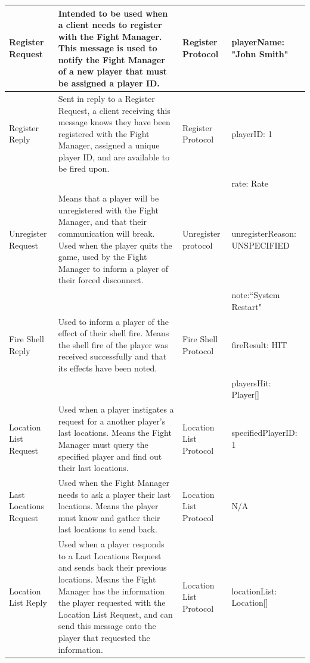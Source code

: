 \documentclass[12pt]{article}
\begin{document}
			\begin{supertabular}{|p{2cm}|p{5cm}|p{3cm}|p{4cm}|}
				Register Request & Intended to be used when a client needs to register with the Fight Manager. This message is used to notify the Fight Manager of a new player that must be assigned a player ID. & Register Protocol & playerName: "John Smith" \\ \hline
				Register Reply & Sent in reply to a Register Request, a client receiving this message knows they have been registered with the Fight Manager, assigned a unique player ID, and are available to be fired upon. & Register Protocol & playerID: 1 \\&&& rate: Rate \\ \hline
				
				Unregister Request & Means that a player will be unregistered with the Fight Manager, and that their communication will break. Used when the player quits the game, used by the Fight Manager to inform a player of their forced disconnect. & Unregister protocol & unregisterReason: UNSPECIFIED \\ &&&note:``System Restart" \\ \hline
				
				Fire Shell Reply & Used to inform a player of the effect of their shell fire. Means the shell fire of the player was received successfully and that its effects have been noted. & Fire Shell Protocol & fireResult: HIT \\&&&playersHit: Player[]\\ \hline
				
				Location List Request& Used when a player instigates a request for a another player's last locations. Means the Fight Manager must query the specified player and find out their last locations.& Location List Protocol&specifiedPlayerID: 1\\ \hline
				Last Locations Request&Used when the Fight Manager needs to ask a player their last locations. Means the player must know and gather their last locations to send back.&Location List Protocol&N/A\\ \hline
				Location List Reply&Used when a player responds to a Last Locations Request and sends back their previous locations. Means the Fight Manager has the information the player requested with the Location List Request, and can send this message onto the player that requested the information.&Location List Protocol&locationList: Location[]\\ \hline
				

\end{supertabular}
\end{document}
